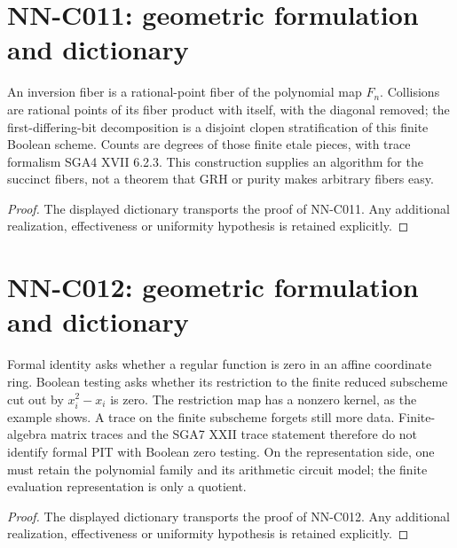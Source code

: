 \section{NN-C011: geometric formulation and dictionary}
\begin{geometricstatement}[NN-C011]
An inversion fiber is a rational-point fiber of the polynomial map $F_n$. Collisions are rational points of its fiber product with itself, with the diagonal removed; the first-differing-bit decomposition is a disjoint clopen stratification of this finite Boolean scheme. Counts are degrees of those finite etale pieces, with trace formalism SGA4 XVII 6.2.3. This construction supplies an algorithm for the succinct fibers, not a theorem that GRH or purity makes arbitrary fibers easy.
\end{geometricstatement}
\begin{proof} The displayed dictionary transports the proof of NN-C011. Any additional realization, effectiveness or uniformity hypothesis is retained explicitly.\end{proof}


\section{NN-C012: geometric formulation and dictionary}
\begin{geometricstatement}[NN-C012]
Formal identity asks whether a regular function is zero in an affine coordinate ring. Boolean testing asks whether its restriction to the finite reduced subscheme cut out by $x_i^2-x_i$ is zero. The restriction map has a nonzero kernel, as the example shows. A trace on the finite subscheme forgets still more data. Finite-algebra matrix traces and the SGA7 XXII trace statement therefore do not identify formal PIT with Boolean zero testing. On the representation side, one must retain the polynomial family and its arithmetic circuit model; the finite evaluation representation is only a quotient.
\end{geometricstatement}
\begin{proof} The displayed dictionary transports the proof of NN-C012. Any additional realization, effectiveness or uniformity hypothesis is retained explicitly.\end{proof}


